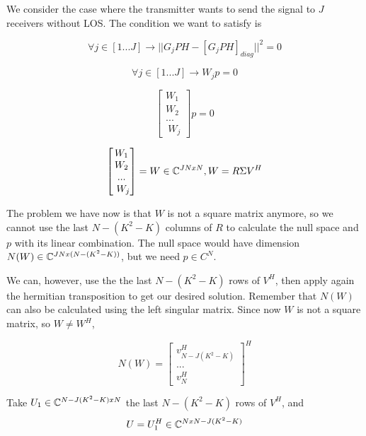 We consider the case where the transmitter wants to send the signal to $J$ receivers without LOS. The condition we want to satisfy is

\begin{equation}
  \forall j \in [1...J] \rightarrow || G_jPH - [G_jPH]_{diag} || ^2 = 0
\end{equation}

\begin{equation}
  \forall j \in [1...J] \rightarrow W_jp = 0
\end{equation}

\begin{equation}
  \begin{bmatrix}
    W_1  \\
    W_ 2 \\
    ...  \\\
    W_j
  \end{bmatrix}
  p = 0
\end{equation}

\begin{equation}
  \begin{bmatrix}
    W_1  \\
    W_ 2 \\
    ...  \\\
    W_j
  \end{bmatrix}
  = W \in \mathbb{C} ^ {JNxN}, W = R \Sigma V^H
\end{equation}

The problem we have now is that $W$ is not a square matrix anymore, so we cannot use the last $N - (K^2 - K)$ columns of $R$ to calculate the null space and $p$ with its linear combination. The null space would have dimension $N(W) \in \mathbb{C}^{JN x (N - (K^2 - K))}$, but we need $p \in C^N$.

We can, however, use the the last $N - (K^2 - K)$ rows of $V^H$, then apply again the hermitian transposition to get our desired solution. Remember that $N(W)$ can also be calculated using the left singular matrix. Since now $W$ is not a square matrix, so $W \ne W^H$,

\begin{equation}
  N(W) = \begin{bmatrix} v^H_{N - J(K^2 - K)} \\ ... \\ v^H_N \end{bmatrix} ^ H
\end{equation}

Take $U_1 \in \mathbb{C} ^ {N - J(K^2 - K) x N}$ the last $N - (K^2 - K)$ rows of $V^H$, and
\begin{equation}
  U = U_1^H \in \mathbb{C} ^ {N x N - J(K^2 - K)}
\end{equation}

